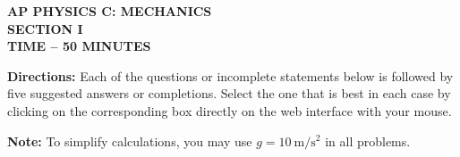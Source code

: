 \documentclass[12pt]{../../oss-apphys-exam}
\begin{document}
\begin{center}
  {
    \Large
    \textbf{AP PHYSICS C: MECHANICS \\SECTION I \\TIME -- 50 MINUTES}
  }
\end{center}

\textbf{Directions:} Each of the questions or incomplete statements below is
followed by five suggested answers or completions. Select the one that is best
in each case by clicking on the corresponding box directly on the web interface
with your mouse.

\vspace{.1in}\textbf{Note:} To simplify calculations, you may use
$g=\SI{10}{\metre\per\second\squared}$ in all problems.
\end{document}
